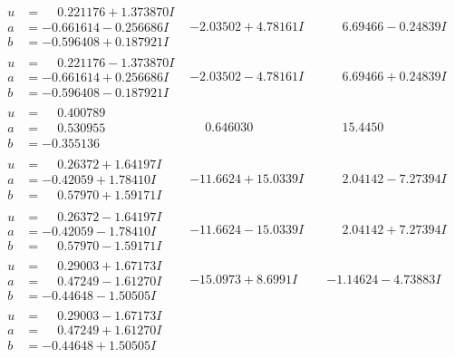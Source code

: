 \documentclass[1p]{elsarticle_modified}
\theoremstyle{definition}
\begin{document}
$$\begin{array}{c|c|c}
\begin{aligned}
u &= \phantom{-}0.221176 + 1.373870 I \\
a &= -0.661614 - 0.256686 I \\
b &= -0.596408 + 0.187921 I\end{aligned}
 & -2.03502 + 4.78161 I & \phantom{-}6.69466 - 0.24839 I \\ \hline\begin{aligned}
u &= \phantom{-}0.221176 - 1.373870 I \\
a &= -0.661614 + 0.256686 I \\
b &= -0.596408 - 0.187921 I\end{aligned}
 & -2.03502 - 4.78161 I & \phantom{-}6.69466 + 0.24839 I \\ \hline\begin{aligned}
u &= \phantom{-}0.400789\phantom{ +0.000000I} \\
a &= \phantom{-}0.530955\phantom{ +0.000000I} \\
b &= -0.355136\phantom{ +0.000000I}\end{aligned}
 & \phantom{-}0.646030\phantom{ +0.000000I} & \phantom{-}15.4450\phantom{ +0.000000I} \\ \hline\begin{aligned}
u &= \phantom{-}0.26372 + 1.64197 I \\
a &= -0.42059 + 1.78410 I \\
b &= \phantom{-}0.57970 + 1.59171 I\end{aligned}
 & -11.6624 + 15.0339 I & \phantom{-}2.04142 - 7.27394 I \\ \hline\begin{aligned}
u &= \phantom{-}0.26372 - 1.64197 I \\
a &= -0.42059 - 1.78410 I \\
b &= \phantom{-}0.57970 - 1.59171 I\end{aligned}
 & -11.6624 - 15.0339 I & \phantom{-}2.04142 + 7.27394 I \\ \hline\begin{aligned}
u &= \phantom{-}0.29003 + 1.67173 I \\
a &= \phantom{-}0.47249 - 1.61270 I \\
b &= -0.44648 - 1.50505 I\end{aligned}
 & -15.0973 + 8.6991 I & -1.14624 - 4.73883 I \\ \hline\begin{aligned}
u &= \phantom{-}0.29003 - 1.67173 I \\
a &= \phantom{-}0.47249 + 1.61270 I \\
b &= -0.44648 + 1.50505 I\end{aligned}

\end{array}$$
\end{document}

